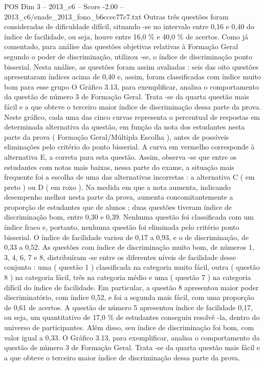 \begin{textsample}{POS Dim 3 – 2013\_c6 – Score -2.00 – 2013\_c6/enade\_2013\_fono\_b6ccec77c7.txt}
Outras três questões foram consideradas de dificuldade difícil, situando -se no intervalo entre 0,16 e 0,40 do índice de facilidade, ou seja, houve entre 16,0 \% e 40,0 \% de acertos.
Como já comentado, para análise das questões objetivas relativas à Formação Geral segundo o poder de discriminação, utilizou -se, o índice de discriminação ponto bisserial.
Nesta análise, as questões foram assim avaliadas : seis das oito questões apresentaram índices acima de 0,40 e, assim, foram classificadas com índice muito bom para esse grupo O Gráfico 3.13, para exemplificar, analisa o comportamento da questão de número 3 de Formação Geral.
Trata -se da quarta questão mais fácil e a que obteve o terceiro maior índice de discriminação dessa parte da prova.
Neste gráfico, cada uma das cinco curvas representa o percentual de respostas em determinada alternativa da questão, em função da nota dos estudantes nesta parte da prova ( Formação Geral/Múltipla Escolha ), antes de possíveis eliminações pelo critério do ponto bisserial.
A curva em vermelho corresponde à alternativa E, a correta para esta questão.
Assim, observa -se que entre os estudantes com notas mais baixas, nessa parte do exame, a situação mais frequente foi a escolha de uma das alternativas incorretas : a alternativa C ( em preto ) ou D ( em roxo ).
Na medida em que a nota aumenta, indicando desempenho melhor nesta parte da prova, aumenta concomitantemente a proporção de estudantes que de alunos ; duas questões tiveram índice de discriminação bom, entre 0,30 e 0,39.
Nenhuma questão foi classificada com um índice fraco e, portanto, nenhuma questão foi eliminada pelo critério ponto bisserial.
O índice de facilidade variou de 0,17 a 0,93, e o de discriminação, de 0,33 a 0,52.
As questões com índice de discriminação muito bom, de números 1, 3, 4, 6, 7 e 8, distribuíram -se entre os diferentes níveis de facilidade desse conjunto : uma ( questão 1 ) classificada na categoria muito fácil, outra ( questão 8 ) na categoria fácil, três na categoria médio e uma ( questão 7 ) na categoria difícil do índice de facilidade.
Em particular, a questão 8 apresentou maior poder discriminatório, com índice 0,52, e foi a segunda mais fácil, com uma proporção de 0,61 de acertos.
A questão de número 5 apresentou índice de facilidade 0,17, ou seja, um quantitativo de 17,0 \% de estudantes conseguiu resolvê -la, dentro do universo de participantes.
Além disso, seu índice de discriminação foi bom, com valor igual a 0,33.
O Gráfico 3.13, para exemplificar, analisa o comportamento da questão de número 3 de Formação Geral.
Trata -se da quarta questão mais fácil e a que obteve o terceiro maior índice de discriminação dessa parte da prova.

\end{textsample}
